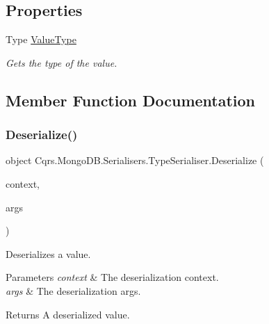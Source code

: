 \subsection*{Properties}
\begin{DoxyCompactItemize}
\item 
Type \hyperlink{classCqrs_1_1MongoDB_1_1Serialisers_1_1TypeSerialiser_af5d06e2fe995f816c840a8ceefd22991}{Value\+Type}
\begin{DoxyCompactList}\small\item\em Gets the type of the value. \end{DoxyCompactList}\end{DoxyCompactItemize}


\subsection{Member Function Documentation}
\mbox{\label{classCqrs_1_1MongoDB_1_1Serialisers_1_1TypeSerialiser_a5e8aa7ae1372033da215d02b79947b20}} 
\subsubsection{\texorpdfstring{Deserialize()}{Deserialize()}}
{\footnotesize\ttfamily object Cqrs.\+Mongo\+D\+B.\+Serialisers.\+Type\+Serialiser.\+Deserialize (\begin{DoxyParamCaption}\item[{Bson\+Deserialization\+Context}]{context,  }\item[{Bson\+Deserialization\+Args}]{args }\end{DoxyParamCaption})}



Deserializes a value. 


\begin{DoxyParams}{Parameters}
{\em context} & The deserialization context.\\
\hline
{\em args} & The deserialization args.\\
\hline
\end{DoxyParams}
\begin{DoxyReturn}{Returns}
A deserialized value. 
\end{DoxyReturn}
\mbox{\label{classCqrs_1_1MongoDB_1_1Serialisers_1_1TypeSerialiser_a4aec60f5df74f482b576f4e0dad0d5f6}} 
